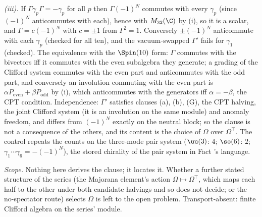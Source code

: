 \emph{(iii).} If $\Gamma\gamma_{p}\Gamma = -\gamma_{p}$ for all $p$ then $\Gamma(-1)^{N}$ commutes with every $\gamma_{p}$ (since $(-1)^{N}$ anticommutes with each), hence with $M_{32}(\C)$ by (i), so it is a scalar, and $\Gamma = c(-1)^{N}$ with $c = \pm1$ from $\Gamma^{2} = 1$. Conversely $\pm(-1)^{N}$ anticommute with each $\gamma_{p}$ (checked for all ten), and the vacuum-swapped $\Gamma'$ fails for $\gamma_{1}$ (checked). The equivalence with the $\Spin(10)$ form: $\Gamma$ commutes with the bivectors iff it commutes with the even subalgebra they generate; a grading of the Clifford system commutes with the even part and anticommutes with the odd part, and conversely an involution commuting with the even part is $\alpha P_{\mathrm{even}} + \beta P_{\mathrm{odd}}$ by (i), which anticommutes with the generators iff $\alpha = -\beta$, the CPT condition. Independence: $\Gamma'$ satisfies clauses (a), (b), (G), the CPT halving, the joint Clifford system (it is an involution on the same module) and anomaly freedom, and differs from $(-1)^{N}$ exactly on the neutral block; so the clause is not a consequence of the others, and its content is the choice of $\Omega$ over $\Omega^{\top}$. The control repeats the counts on the three-mode pair system ($\uu(3)$: $4$; $\so(6)$: $2$; $\gamma_{1}\cdots\gamma_{6} = -(-1)^{N}$), the stored chirality of the pair system in Fact 's language.

\emph{Scope.} Nothing here derives the clause; it locates it. Whether a further stated structure of the series (the Majorana element's action $\Omega \mapsto \Omega^{\top}$, which maps each half to the other under both candidate halvings and so does not decide; or the no-spectator route) selects $\Omega$ is left to the open problem. Transport-absent: finite Clifford algebra on the series' module.
